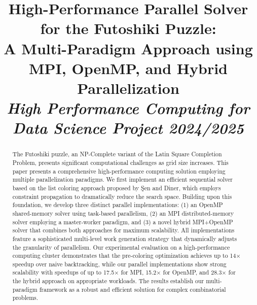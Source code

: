 \documentclass[10pt, conference]{IEEEtran}
\begin{document}
\title{High-Performance Parallel Solver for the Futoshiki Puzzle:\\
A Multi-Paradigm Approach using MPI, OpenMP, and Hybrid Parallelization\\
\normalsize \textit{High Performance Computing for Data Science Project 2024/2025}
}

\author{
\and
{}
\and
{}
}

\maketitle

\begin{abstract}
The Futoshiki puzzle, an NP-Complete variant of the Latin Square Completion Problem, presents significant computational challenges as grid size increases. This paper presents a comprehensive high-performance computing solution employing multiple parallelization paradigms. We first implement an efficient sequential solver based on the list coloring approach proposed by Şen and Diner, which employs constraint propagation to dramatically reduce the search space. Building upon this foundation, we develop three distinct parallel implementations: (1) an OpenMP shared-memory solver using task-based parallelism, (2) an MPI distributed-memory solver employing a master-worker paradigm, and (3) a novel hybrid MPI+OpenMP solver that combines both approaches for maximum scalability. All implementations feature a sophisticated multi-level work generation strategy that dynamically adjusts the granularity of parallelism. Our experimental evaluation on a high-performance computing cluster demonstrates that the pre-coloring optimization achieves up to 14× speedup over naive backtracking, while our parallel implementations show strong scalability with speedups of up to 17.5× for MPI, 15.2× for OpenMP, and 28.3× for the hybrid approach on appropriate workloads. The results establish our multi-paradigm framework as a robust and efficient solution for complex combinatorial problems.
\end{abstract}
\end{document}
